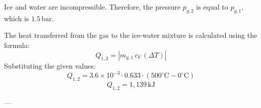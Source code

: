 Ice and water are incompressible. Therefore, the pressure \( p_{g,2} \) is equal to \( p_{g,1} \), which is \( 1.5 \, \text{bar} \).

The heat transferred from the gas to the ice-water mixture is calculated using the formula:  
\[
Q_{1,2} = |m_{g,1} \, c_V \, (\Delta T)|
\]  
Substituting the given values:  
\[
Q_{1,2} = 3.6 \times 10^{-3} \cdot 0.633 \cdot (500^\circ\text{C} - 0^\circ\text{C})
\]  
\[
Q_{1,2} = 1,139 \, \text{kJ}
\]  

---